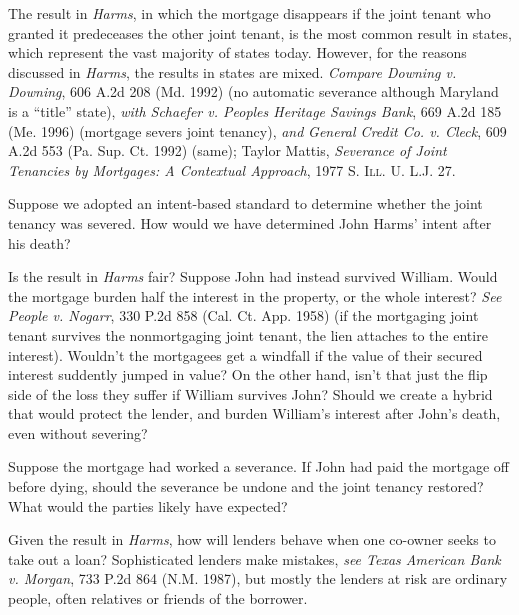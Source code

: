 
\item The result in \emph{Harms}, in which the mortgage disappears if the joint
tenant who granted it predeceases the other joint tenant, is the most common
result in  states, which represent the vast majority of states
today. However, for the reasons discussed in \emph{Harms}, the results in
 states are mixed. \emph{Compare Downing v. Downing}, 606 A.2d 208 (Md.
1992) (no automatic severance although Maryland is a ``title'' state),
\emph{with Schaefer v. Peoples Heritage Savings Bank}, 669 A.2d 185 (Me. 1996)
(mortgage severs joint tenancy), \emph{and} \emph{General Credit Co. v. Cleck},
609
A.2d 553 (Pa. Sup. Ct. 1992) (same); Taylor Mattis, \emph{Severance of Joint
Tenancies by Mortgages: A Contextual Approach}, 1977 \textsc{S. Ill. U. L.J.}
27.


Suppose we adopted an intent-based standard to determine whether the joint
tenancy was severed. How would we have determined John Harms' intent after his
death?



\item Is the result in \textit{Harms} fair? Suppose John had instead survived
William. Would the mortgage burden half the interest in the property, or the
whole interest? \textit{See} \emph{People v. Nogarr}, 330 P.2d 858 (Cal. Ct.
App. 1958) (if the mortgaging joint tenant survives the nonmortgaging joint
tenant, the lien attaches to the entire interest). Wouldn't the mortgagees get a
windfall if the value of their secured interest suddently jumped in value? On
the other hand, isn't that just the flip side of the loss they suffer if
William survives John? Should we create a hybrid that would protect the
lender, and burden William's interest after John's death, even without
severing?


Suppose the mortgage had worked a severance. If John had paid the mortgage off
before dying, should the severance be undone and the joint tenancy restored?
What would the parties likely have expected?



\item Given the result in \textit{Harms}, how will lenders behave when one
co-owner seeks to take out a loan? Sophisticated lenders make mistakes,
\emph{see Texas American Bank v. Morgan}, 733 P.2d 864 (N.M. 1987), but mostly
the lenders at risk are ordinary people, often relatives or friends of the
borrower.



